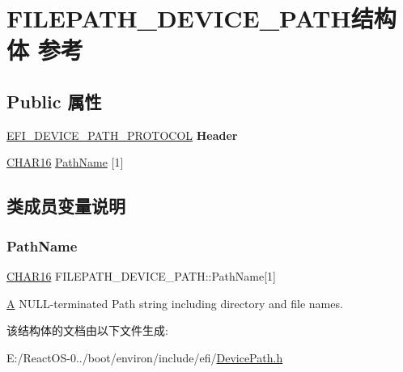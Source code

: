\hypertarget{struct_f_i_l_e_p_a_t_h___d_e_v_i_c_e___p_a_t_h}{}\section{F\+I\+L\+E\+P\+A\+T\+H\+\_\+\+D\+E\+V\+I\+C\+E\+\_\+\+P\+A\+T\+H结构体 参考}
\label{struct_f_i_l_e_p_a_t_h___d_e_v_i_c_e___p_a_t_h}
\subsection*{Public 属性}
\begin{DoxyCompactItemize}
\item 
\mbox{\label{struct_f_i_l_e_p_a_t_h___d_e_v_i_c_e___p_a_t_h_ad5f5ab4e5a66a3f4062817b186dbdaba}} 
\hyperlink{struct_e_f_i___d_e_v_i_c_e___p_a_t_h___p_r_o_t_o_c_o_l}{E\+F\+I\+\_\+\+D\+E\+V\+I\+C\+E\+\_\+\+P\+A\+T\+H\+\_\+\+P\+R\+O\+T\+O\+C\+OL} {\bfseries Header}
\item 
\hyperlink{_processor_bind_8h_a7ae886893bd2a2ae253eb2b021a48724}{C\+H\+A\+R16} \hyperlink{struct_f_i_l_e_p_a_t_h___d_e_v_i_c_e___p_a_t_h_a91e2b911d078ed61e53afeb855e26461}{Path\+Name} \mbox{[}1\mbox{]}
\end{DoxyCompactItemize}


\subsection{类成员变量说明}
\mbox{\label{struct_f_i_l_e_p_a_t_h___d_e_v_i_c_e___p_a_t_h_a91e2b911d078ed61e53afeb855e26461}} 
\subsubsection{\texorpdfstring{Path\+Name}{PathName}}
{\footnotesize\ttfamily \hyperlink{_processor_bind_8h_a7ae886893bd2a2ae253eb2b021a48724}{C\+H\+A\+R16} F\+I\+L\+E\+P\+A\+T\+H\+\_\+\+D\+E\+V\+I\+C\+E\+\_\+\+P\+A\+T\+H\+::\+Path\+Name\mbox{[}1\mbox{]}}

\hyperlink{struct_a}{A} N\+U\+L\+L-\/terminated Path string including directory and file names. 

该结构体的文档由以下文件生成\+:\begin{DoxyCompactItemize}
\item 
E\+:/\+React\+O\+S-\/0../boot/environ/include/efi/\hyperlink{_device_path_8h}{Device\+Path.\+h}\end{DoxyCompactItemize}
